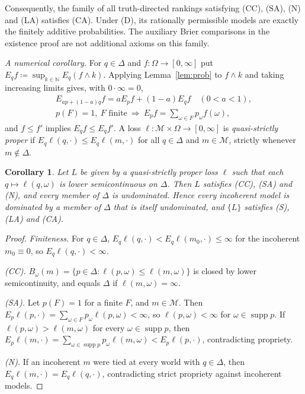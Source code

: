 \documentclass[11pt]{article}
\newenvironment{chgblockb}{\color{red}}{}
\newtheorem{corollary}[theorem]{Corollary}
\theoremstyle{definition}
\theoremstyle{remark}
\newcommand{\M}{\mathcal M}
\newcommand{\supp}{\operatorname{supp}}
\begin{document}
\begin{chgblockb}
Consequently, the family of all truth-directed rankings satisfying (CC), (SA), (N) and (LA) satisfies (CA). Under (D), its rationally permissible models are exactly the finitely additive probabilities. The auxiliary Brier comparisons in the existence proof are not additional axioms on this family.

\emph{A numerical corollary.} For $q\in\Delta$ and $f:\Omega\to[0,\infty]$ put $E_qf\coloneqq\sup_{k\in\mathbb N}E_q(f\wedge k)$. Applying Lemma~\ref{lem:prob} to $f\wedge k$ and taking increasing limits gives, with $0\cdot\infty=0$,
\begin{gather*}
E_{ap+(1-a)q}f=aE_pf+(1-a)E_qf\quad(0<a<1),\\
p(F)=1,\ F\text{ finite}\ \Longrightarrow\ E_pf=\textstyle\sum_{\omega\in F}p_\omega f(\omega),
\end{gather*}
and $f\le f'$ implies $E_qf\le E_qf'$. A loss $\ell:\M\times\Omega\to[0,\infty]$ is \emph{quasi-strictly proper} if $E_q\ell(q,\cdot)\le E_q\ell(m,\cdot)$ for all $q\in\Delta$ and $m\in\M$, strictly whenever $m\notin\Delta$.

\begin{corollary}\label{cor:probabilism}
Let $L$ be given by a quasi-strictly proper loss $\ell$ such that each $q\mapsto\ell(q,\omega)$ is lower semicontinuous on $\Delta$. Then $L$ satisfies (CC), (SA) and (N), and every member of $\Delta$ is undominated. Hence every incoherent model is dominated by a member of $\Delta$ that is itself undominated, and $\{L\}$ satisfies (S), (LA) and (CA).
\end{corollary}
\begin{proof}
\emph{Finiteness.} For $q\in\Delta$, $E_q\ell(q,\cdot)<E_q\ell(m_0,\cdot)\le\infty$ for the incoherent $m_0\equiv0$, so $E_q\ell(q,\cdot)<\infty$.

\emph{(CC).} $B_\omega(m)=\{p\in\Delta:\ell(p,\omega)\le\ell(m,\omega)\}$ is closed by lower semicontinuity, and equals $\Delta$ if $\ell(m,\omega)=\infty$.

\emph{(SA).} Let $p(F)=1$ for a finite $F$, and $m\in\M$. Then $E_p\ell(p,\cdot)=\sum_{\omega\in F}p_\omega\ell(p,\omega)<\infty$, so $\ell(p,\omega)<\infty$ for $\omega\in\supp p$. If $\ell(p,\omega)>\ell(m,\omega)$ for every $\omega\in\supp p$, then $E_p\ell(m,\cdot)=\sum_{\omega\in\supp p}p_\omega\ell(m,\omega)<E_p\ell(p,\cdot)$, contradicting propriety.

\emph{(N).} If an incoherent $m$ were tied at every world with $q\in\Delta$, then $E_q\ell(m,\cdot)=E_q\ell(q,\cdot)$, contradicting strict propriety against incoherent models.


\end{proof}
\end{chgblockb}
\end{document}
